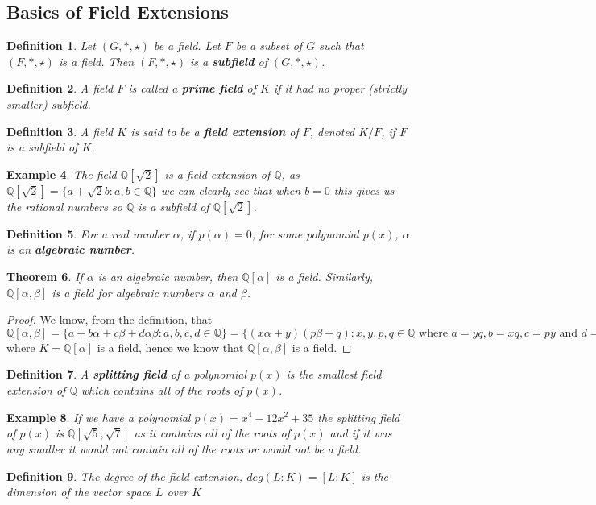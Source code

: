 \documentclass[12pt]{article}
\newtheorem{theorem}{Theorem}
\newtheorem{definition}[theorem]{Definition}
\newtheorem{example}[theorem]{Example}
\begin{document}
\subsection{Basics of Field Extensions}
\begin{definition}
Let \((G, *,\star )\) be a field. Let \(F\) be a subset of \(G\) such that \((F,*,\star)\) is a field. Then \((F, *,\star)\) is a \textbf{subfield}
 of \((G, *, \star)\).
\end{definition}
\begin{definition}
A field \(F\) is called a \textbf{prime field} of \(K\) if it had no proper (strictly smaller) subfield.
\end{definition}
\begin{definition}
A field \(K\) is said to be a \textbf{field extension} of \(F\), denoted \(K / F\), if \(F\) is a subfield of \(K\). \cite{Moy}
\end{definition}
\begin{example}
The field \(\mathbb{Q}[\sqrt{2}]\) is a field extension of \(\mathbb{Q}\), as \(\mathbb{Q}[\sqrt{2}] = \{a + \sqrt{2}b : a,b \in \mathbb{Q}\}\) we can clearly see that when \(b = 0\) this gives us the rational numbers so \(\mathbb{Q}\) is a subfield of \(\mathbb{Q}[\sqrt{2}]\).
\end{example}
\begin{definition}
For a real number \(\alpha\), if \(p(\alpha)=0\), for some polynomial \(p(x)\), \(\alpha\) is an \textbf{\textit{algebraic number}}.
\end{definition}
\begin{theorem}
If \(\alpha\) is an algebraic number, then \(\mathbb{Q}[\alpha]\) is a field. Similarly, \(\mathbb{Q}[\alpha,\beta]\) is a field for algebraic numbers \(\alpha\) and \(\beta\).
\end{theorem}
\begin{proof}
We know, from the definition, that \(\mathbb{Q}[\alpha,\beta] = \{a + b\alpha + c\beta + d\alpha\beta : a,b,c,d \in \mathbb{Q}\} = \{(x\alpha + y)(p\beta + q) : x,y,p,q \in \mathbb{Q} \text{ where } a = yq, b = xq, c = py \text{ and } d = xp \} = \mathbb{Q}[\alpha,\beta] = K[\beta]\) where \(K = \mathbb{Q}[\alpha]\) is a field, hence we know that \(\mathbb{Q}[\alpha,\beta]\) is a field.  
\end{proof}
\begin{definition}
A \textbf{\textit{splitting field}} of a polynomial \(p(x)\) is the smallest field extension of \(\mathbb{Q}\) which contains all of the roots of \(p(x)\).
\end{definition}
\begin{example}
If we have a polynomial \(p(x) = x^4 - 12x^2 + 35\) the splitting field of \(p(x)\) is \(\mathbb{Q}[\sqrt{5},\sqrt{7}]\) as it contains all of the roots of \(p(x)\) and if it was any smaller it would not contain all of the roots or would not be a field.
\end{example}
\begin{definition}
    The degree of the field extension, $deg(L:K)=[L:K]$ is the dimension of the vector space $L$ over $K$
\end{definition}
\end{document}
